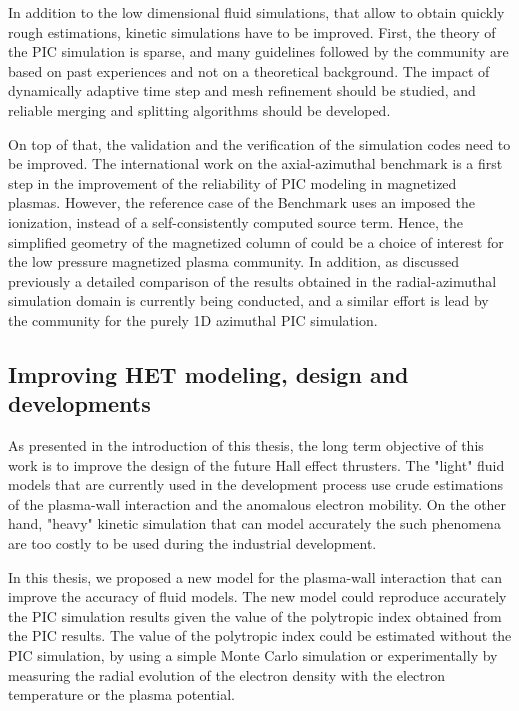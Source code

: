     In addition to the low dimensional fluid simulations, that allow to obtain quickly rough estimations, kinetic simulations have to be improved.
    First, the theory of the PIC simulation is sparse, and many guidelines followed by the community are based on past experiences and not on a theoretical background.
    The impact of dynamically adaptive time step and mesh refinement should be studied, and reliable merging and splitting algorithms should be developed.

    On top of that, the validation and the verification of the simulation codes need to be improved.
    The international work on the axial-azimuthal benchmark \citep{charoy2019} is a first step in the improvement of the reliability of PIC modeling in magnetized plasmas.
    However, the reference case of the Benchmark uses an imposed the ionization, instead of a self-consistently computed source term.
    Hence, the simplified geometry of the magnetized column of \citet{lucken2019} could be a choice of interest for the low pressure magnetized plasma community.
    In addition, as discussed previously a detailed comparison of the results obtained in the radial-azimuthal simulation domain is currently being conducted, and a similar effort is lead by the community for the purely 1D azimuthal PIC simulation.
    

  \subsection{Improving HET modeling, design and developments } 

    As presented in the introduction of this thesis, the long term objective of this work is to improve the design of the future Hall effect thrusters.
    The "light" fluid models that are currently used in the development process use crude estimations of the plasma-wall interaction and the anomalous electron mobility.
    On the other hand, "heavy" kinetic simulation that can model accurately the such phenomena are too costly to be used during the industrial development.

    In this thesis, we proposed a new model for the plasma-wall interaction that can improve the accuracy of fluid models.
    The new model could reproduce accurately the PIC simulation results given the value of the polytropic index obtained from the PIC results.
    The value of the polytropic index could be estimated without the PIC simulation, by using a simple Monte Carlo simulation or experimentally by measuring the radial evolution of the electron density with the electron temperature or the plasma potential.

